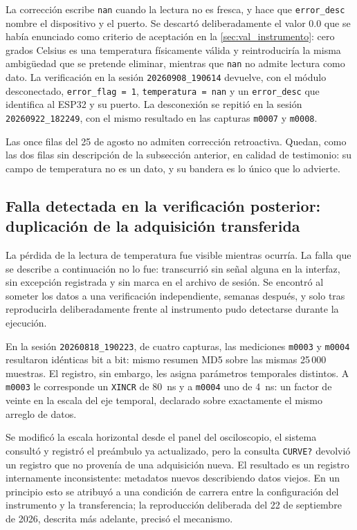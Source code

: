La corrección escribe \texttt{nan} cuando la lectura no es fresca, y
hace que \texttt{error\_desc} nombre el dispositivo y el puerto. Se
descartó deliberadamente el valor \num{0.0} que se había enunciado como
criterio de aceptación en la \cref{sec:val_instrumento}: cero grados
Celsius es una temperatura físicamente válida y reintroduciría la misma
ambigüedad que se pretende eliminar, mientras que \texttt{nan} no
admite lectura como dato. La verificación en la sesión
\texttt{20260908\_190614} devuelve, con el módulo desconectado,
\texttt{error\_flag = 1}, \texttt{temperatura = nan} y un
\texttt{error\_desc} que identifica al ESP32 y su puerto. La
desconexión se repitió en la sesión \texttt{20260922\_182249}, con el
mismo resultado en las capturas \texttt{m0007} y \texttt{m0008}.

Las once filas del 25 de agosto no admiten corrección retroactiva.
Quedan, como las dos filas sin descripción de la subsección anterior,
en calidad de testimonio: su campo de temperatura no es un dato, y su
bandera es lo único que lo advierte.

\subsection{Falla detectada en la verificación posterior: duplicación
de la adquisición transferida}
\label{sec:falla_buffer}

La pérdida de la lectura de temperatura fue visible mientras ocurría. La
falla que se describe a
continuación no lo fue: transcurrió sin señal alguna en la interfaz, sin
excepción registrada y sin marca en el archivo de sesión. Se encontró al
someter los datos a una verificación independiente, semanas después, y
solo tras reproducirla deliberadamente frente al instrumento pudo
detectarse durante la ejecución.

En la sesión \texttt{20260818\_190223}, de cuatro capturas, las
mediciones \texttt{m0003} y \texttt{m0004} resultaron idénticas bit a
bit: mismo resumen MD5 sobre las mismas 25\,000 muestras. El registro,
sin embargo, les asigna parámetros temporales distintos. A
\texttt{m0003} le corresponde un \texttt{XINCR} de \SI{80}{\nano\second}
y a \texttt{m0004} uno de \SI{4}{\nano\second}: un factor de veinte en
la escala del eje temporal, declarado sobre exactamente el mismo
arreglo de datos.

Se modificó la escala horizontal desde
el panel del osciloscopio, el sistema consultó y registró el preámbulo
ya actualizado, pero la consulta \texttt{CURVE?} devolvió un registro
que no provenía de una adquisición nueva. El resultado es un
registro internamente inconsistente: metadatos nuevos describiendo
datos viejos. En un principio esto se atribuyó a una condición de
carrera entre la configuración del instrumento y la transferencia; la
reproducción deliberada del 22 de septiembre de 2026, descrita más
adelante, precisó el mecanismo.


